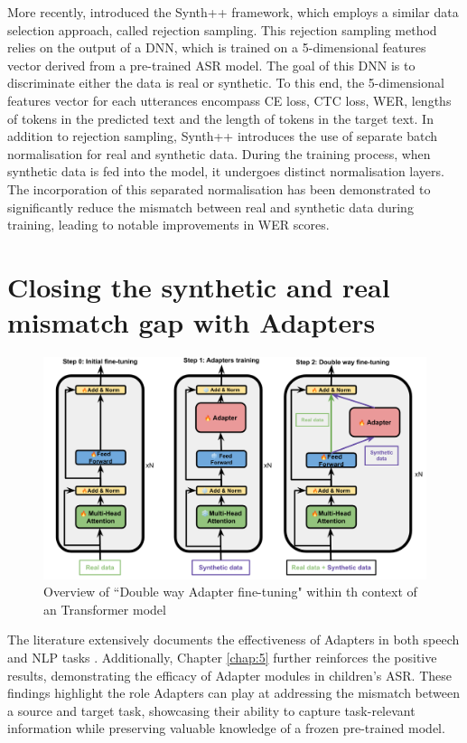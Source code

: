 More recently, \cite{hu2022synt++} introduced the Synth++ framework, which employs a similar data selection approach, called rejection sampling. This rejection sampling method relies on the output of a \ac{DNN}, which is trained on a 5-dimensional features vector derived from a pre-trained \ac{ASR} model. The goal of this \ac{DNN} is to discriminate either the data is real or synthetic. To this end, the 5-dimensional features vector for each utterances encompass \ac{CE} loss, \ac{CTC} loss, \ac{WER}, lengths of tokens in the predicted text and the length of tokens in the target text. In addition to rejection sampling, Synth++ introduces the use of separate batch normalisation for real and synthetic data. During the training process, when synthetic data is fed into the model, it undergoes distinct normalisation layers. The incorporation of this separated normalisation has been demonstrated to significantly reduce the mismatch between real and synthetic data during training, leading to notable improvements in \ac{WER} scores.

\section{Closing the synthetic and real mismatch gap with Adapters}

\begin{figure}
    \centering
    \includegraphics[width=\textwidth]{imgs/TTS_Transformer.png}
    \caption{Overview of ``Double way Adapter fine-tuning"  within th context of an Transformer model}
    \label{fig:overall}
\end{figure}

The literature extensively documents the effectiveness of Adapters in both speech and \ac{NLP} tasks \cite{pfeiffer, philip2020monolingual, mao-etal-2022-unipelt}. Additionally, Chapter \ref{chap:5} further reinforces the positive results, demonstrating the efficacy of Adapter modules in children's \ac{ASR}. These findings highlight the role Adapters can play at addressing the mismatch between a source and target task, showcasing their ability to capture task-relevant information while preserving valuable knowledge of a frozen pre-trained model.

